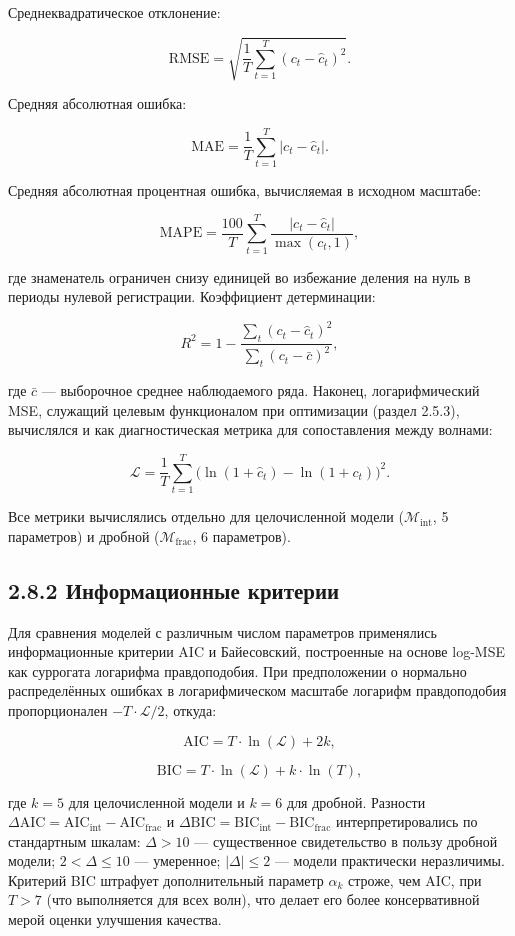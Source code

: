 \documentclass[12pt]{article}
\begin{document}
Среднеквадратическое отклонение:

\[\text{RMSE} = \sqrt{\frac{1}{T}\sum_{t=1}^{T}(c_t - \hat{c}_t)^2}.\]

Средняя абсолютная ошибка:

\[\text{MAE} = \frac{1}{T}\sum_{t=1}^{T}|c_t - \hat{c}_t|.\]

Средняя абсолютная процентная ошибка, вычисляемая в исходном масштабе:

\[\text{MAPE} = \frac{100}{T}\sum_{t=1}^{T}\frac{|c_t - \hat{c}_t|}{\max(c_t, 1)},\]

где знаменатель ограничен снизу единицей во избежание деления на нуль в
периоды нулевой регистрации. Коэффициент детерминации:

\[R^2 = 1 - \frac{\sum_{t}(c_t - \hat{c}_t)^2}{\sum_{t}(c_t - \bar{c})^2},\]

где \(\bar{c}\) --- выборочное среднее наблюдаемого ряда. Наконец,
логарифмический MSE, служащий целевым функционалом при оптимизации
(раздел 2.5.3), вычислялся и как диагностическая метрика для
сопоставления между волнами:

\[\mathcal{L} = \frac{1}{T}\sum_{t=1}^{T}\bigl(\ln(1 + \hat{c}_t) - \ln(1 + c_t)\bigr)^2.\]

Все метрики вычислялись отдельно для целочисленной модели
(\(\mathcal{M}_{\text{int}}\), 5 параметров) и дробной
(\(\mathcal{M}_{\text{frac}}\), 6 параметров).

\subsection{2.8.2 Информационные
критерии}\label{ux438ux43dux444ux43eux440ux43cux430ux446ux438ux43eux43dux43dux44bux435-ux43aux440ux438ux442ux435ux440ux438ux438}

Для сравнения моделей с различным числом параметров применялись
информационные критерии AIC и Байесовский, построенные на основе log-MSE
как суррогата логарифма правдоподобия. При предположении о нормально
распределённых ошибках в логарифмическом масштабе логарифм правдоподобия
пропорционален \(-T \cdot \mathcal{L}/2\), откуда:

\[\text{AIC} = T \cdot \ln(\mathcal{L}) + 2k,\]

\[\text{BIC} = T \cdot \ln(\mathcal{L}) + k \cdot \ln(T),\]

где \(k = 5\) для целочисленной модели и \(k = 6\) для дробной. Разности
\(\Delta\text{AIC} = \text{AIC}_{\text{int}} - \text{AIC}_{\text{frac}}\)
и
\(\Delta\text{BIC} = \text{BIC}_{\text{int}} - \text{BIC}_{\text{frac}}\)
интерпретировались по стандартным шкалам: \(\Delta > 10\) ---
существенное свидетельство в пользу дробной модели;
\(2 < \Delta \leq 10\) --- умеренное; \(|\Delta| \leq 2\) --- модели
практически неразличимы. Критерий BIC штрафует дополнительный параметр
\(\alpha_k\) строже, чем AIC, при \(T > 7\) (что выполняется для всех
волн), что делает его более консервативной мерой оценки улучшения
качества.
\end{document}
